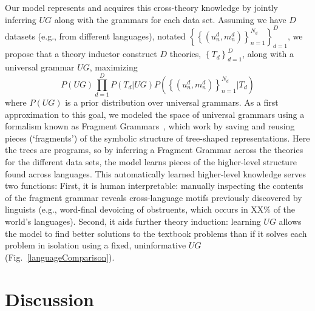 \documentclass[12pt]{article}
\begin{document}
Our model represents and acquires this cross-theory knowledge
by jointly inferring $UG$ along with the grammars for each data set.
Assuming we have $D$ datasets (e.g., from different languages),
notated $\left\{\left\{(u_n^d,m_n^d) \right\}_{n = 1}^{N_d} \right\}_{d = 1}^D$,
we propose that a
theory inductor construct $D$ theories, $\left\{T_d \right\}_{d = 1}^D$,
along with a universal grammar $UG$, maximizing
$$
P(UG)\prod_{d = 1}^D P(T_d|UG)P(\left\{(u_n^d,m_n^d) \right\}_{n = 1}^{N_d}|T_d)
$$
where $P(UG)$ is a prior distribution over universal grammars.
As a first approximation to this goal,
we modeled the space of universal grammars
using a formalism known as Fragment Grammars~\cite{tim},
which work by saving and reusing pieces (`fragments')
of the symbolic structure of tree-shaped representations.
Here the trees are programs,
so by inferring a Fragment Grammar across the theories for the different data sets,
the model learns
pieces of the higher-level structure
found across languages.
This automatically learned higher-level knowledge
serves two functions:
First, it is human interpretable:
manually inspecting the contents of the fragment grammar reveals
cross-language motifs previously discovered by linguists (e.g., word-final devoicing of obstruents,
which occurs in XX\% of the world's languages).
Second,
it aids further theory induction:
learning $UG$ allows the model to
find better solutions to the textbook problems than if it solves
each problem in isolation using a fixed,
uninformative $UG$ (Fig.~\ref{languageComparison}).



\section*{Discussion}




















\end{document}
